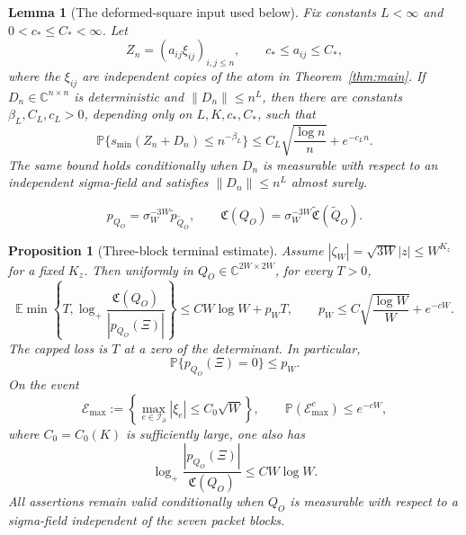 \documentclass[10pt,a4paper]{amsart}
\newtheorem{proposition}{Proposition}
\newtheorem{lemma}{Lemma}
\newcommand{\C}{\mathbb C}
\newcommand{\E}{\mathbb E}
\renewcommand{\P}{\mathbb P}
\begin{document}
\begin{lemma}[The deformed-square input used below]
\label{lem:local-cook-input}
Fix constants \(L<\infty\) and \(0<c_*\leq C_*<\infty\).  Let
\[
 Z_n=(a_{ij}\xi_{ij})_{i,j\leq n},
 \qquad c_*\leq a_{ij}\leq C_*,
\]
where the \(\xi_{ij}\) are independent copies of the atom in
Theorem~\ref{thm:main}.  If \(D_n\in\C^{n\times n}\) is deterministic
and \(\|D_n\|\leq n^L\), then there are constants
\(\beta_L,C_L,c_L>0\), depending only on
$L,K,c_*,C_*$, such that
\begin{equation}
 \P\{s_{\min}(Z_n+D_n)\leq n^{-\beta_L}\}
 \leq C_L\sqrt{\frac{\log n}{n}}+e^{-c_Ln}.
 \label{eq:local-cook-input}
\end{equation}
The same bound holds conditionally when \(D_n\) is measurable with
respect to an independent sigma-field and satisfies
$\|D_n\|\leq n^L$ almost surely.
\end{lemma}

\begin{equation}
 p_{Q_O}=\sigma_W^{-3W}\widetilde p_{\widetilde Q_O},\qquad
 \mathfrak C(Q_O)
 =\sigma_W^{-3W}\widetilde{\mathfrak C}(\widetilde Q_O).
 \label{eq:local-terminal-scaling}
\end{equation}

\begin{proposition}[Three-block terminal estimate]
\label{prop:local-terminal}
Assume \(|\zeta_W|=\sqrt{3W}|z|\leq W^{K_z}\) for a fixed \(K_z\).  Then uniformly in
\(Q_O\in\C^{2W\times2W}\), for every \(T>0\),
\begin{equation}
 \E\min\left\{T,
  \log_+\frac{\mathfrak C(Q_O)}
                   {|p_{Q_O}(\Xi)|}\right\}
 \leq CW\log W+p_WT,
 \qquad
 p_W\leq C\sqrt{\frac{\log W}{W}}+e^{-cW}.
 \label{eq:local-terminal-capped}
\end{equation}
The capped loss is \(T\) at a zero of the determinant.  In particular,
\begin{equation}
 \P\{p_{Q_O}(\Xi)=0\}\leq p_W.
 \label{eq:local-terminal-zero}
\end{equation}
On the event
\begin{equation}
 \mathcal E_{\max}:=\left\{\max_{e\in\mathcal I_{\partial}}|\xi_e|
                 \leq C_0\sqrt W\right\},
 \qquad \P(\mathcal E_{\max}^c)\leq e^{-cW},
 \label{eq:local-max-event}
\end{equation}
where \(C_0=C_0(K)\) is sufficiently large,
one also has
\begin{equation}
 \log_+\frac{|p_{Q_O}(\Xi)|}
                  {\mathfrak C(Q_O)}
 \leq CW\log W.
 \label{eq:local-terminal-reverse}
\end{equation}
All assertions remain valid conditionally when \(Q_O\) is measurable with
respect to a sigma-field independent of the seven packet blocks.
\end{proposition}
\end{document}
